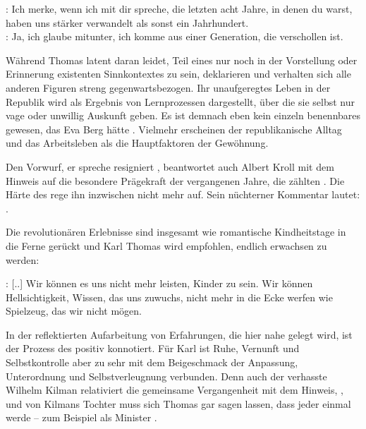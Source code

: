 \begin{BlockQuote}  
: Ich merke, wenn ich mit dir spreche, die letzten acht
Jahre, in denen du  warst, haben uns stärker verwandelt als
sonst ein Jahrhundert.\\
: Ja, ich glaube mitunter, ich komme aus einer
Generation, die verschollen ist. 
\end{BlockQuote}
Während Thomas latent daran leidet, Teil eines nur noch in der Vorstellung
oder Erinnerung existenten Sinnkontextes zu sein, deklarieren und verhalten
sich alle anderen Figuren streng gegenwartsbezogen. Ihr unaufgeregtes Leben in
der Republik wird als Ergebnis von Lernprozessen dargestellt, über die sie
selbst nur vage oder unwillig Auskunft geben. Es ist demnach eben kein einzeln
benennbares \Cite{Erlebnis} gewesen, das Eva Berg \Cite{verhärtet} hätte
. Vielmehr erscheinen der republikanische Alltag und das
Arbeitsleben als die Hauptfaktoren der
Gewöhnung.

Den Vorwurf, er spreche resigniert \Cite{wie ein alter Mann}, beantwortet auch
Albert Kroll mit dem Hinweis auf die besondere Prägekraft der vergangenen
Jahre, die \Cite{zehnfach} zählten . Die Härte des
\Cite{Alltag[s]}  rege
ihn inzwischen nicht mehr auf. Sein nüchterner Kommentar lautet: \Cite{Man
  lernt.}  . 

Die revolutionären Erlebnisse sind insgesamt
wie romantische Kindheitstage in die Ferne gerückt und Karl Thomas wird
empfohlen, endlich erwachsen zu werden:

\begin{BlockQuote}
: [..] Wir können es uns nicht mehr leisten, Kinder zu
sein. Wir können Hellsichtigkeit, Wissen, das uns zuwuchs, nicht mehr in die
Ecke werfen wie Spielzeug, das wir nicht mögen. 
\end{BlockQuote} 
In der reflektierten Aufarbeitung von Erfahrungen, die hier nahe gelegt wird,
ist der Prozess des  positiv konnotiert. Für Karl
ist Ruhe, Vernunft und Selbstkontrolle aber zu sehr 
mit dem Beigeschmack der Anpassung, Unterordnung und
Selbstverleugnung verbunden. Denn auch der verhasste Wilhelm Kilman
relativiert die gemeinsame Vergangenheit mit dem Hinweis, \Cite{was für Kinder
wir waren}, und von Kilmans Tochter muss sich Thomas gar sagen lassen, dass
jeder einmal \Cite{groß} werde -- zum Beispiel als Minister .

